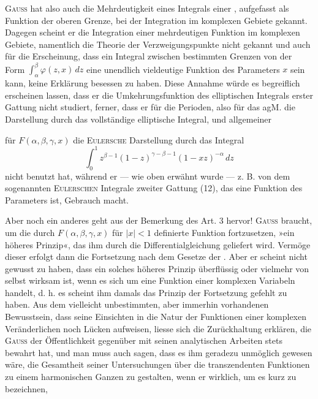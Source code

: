 \par
\textsc{Gauss} hat also auch die Mehrdeutigkeit eines Integrals einer , aufgefasst als Funktion der oberen Grenze, bei der Integration
im komplexen Gebiete gekannt. Dagegen scheint er die Integration
einer mehrdeutigen Funktion im komplexen Gebiete, namentlich die Theorie
der Verzweigungspunkte nicht gekannt und auch für die Erscheinung, dass
ein Integral zwischen bestimmten Grenzen von der Form \(\int_\alpha^\beta\varphi(z,x)\,dz\) eine unendlich
vieldeutige Funktion des Parameters \(x\) sein kann, keine Erklärung
besessen zu haben. Diese Annahme würde es begreiflich erscheinen lassen,
dass er die Umkehrungsfunktion des elliptischen Integrals erster Gattung
nicht  studiert, ferner, dass er für die Perioden, also für das agM.
die Darstellung durch das vollständige elliptische Integral, und allgemeiner\par
\clearpage{}
\noindent für \(F(\alpha,\beta,\gamma,x)\) die \textsc{Eulersche} Darstellung durch das Integral
\[
\int_0^1 z^{\beta-1}(1-z)^{\gamma-\beta-1}(1-xz)^{-\alpha}\,dz
\]
nicht benutzt hat, während er — wie oben erwähnt wurde — z. B. von dem
sogenannten \textsc{Eulerschen} Integrale zweiter Gattung (12), das eine 
Funktion des Parameters ist, Gebrauch macht.
\par
Aber noch ein anderes geht aus der Bemerkung des Art. 3 hervor! \textsc{Gauss}
braucht, um die durch \(F(\alpha,\beta,\gamma,x)\) für \(|x|<1\) definierte Funktion fortzusetzen,
»ein höheres Prinzip«, das ihm durch die Differentialgleichung geliefert wird.
Vermöge dieser erfolgt dann die Fortsetzung nach dem Gesetze der .
Aber er scheint nicht gewusst zu haben, dass ein solches höheres
Prinzip überflüssig oder vielmehr von selbst wirksam ist, wenn es sich um
eine Funktion einer komplexen Variabeln handelt, d. h. es scheint ihm damals
das Prinzip der  Fortsetzung gefehlt zu haben. Aus dem
vielleicht unbestimmten, aber immerhin vorhandenen Bewusstsein, dass seine Einsichten
in die Natur der Funktionen einer komplexen Veränderlichen noch Lücken
aufweisen, liesse sich die Zurückhaltung erklären, die \textsc{Gauss} der Öffentlichkeit
gegenüber mit seinen analytischen Arbeiten stets bewahrt hat, und man muss
auch sagen, dass es ihm geradezu unmöglich gewesen wäre, die Gesamtheit
seiner Untersuchungen über die transzendenten Funktionen zu einem harmonischen
Ganzen zu gestalten, wenn er wirklich, um es kurz zu bezeichnen,
